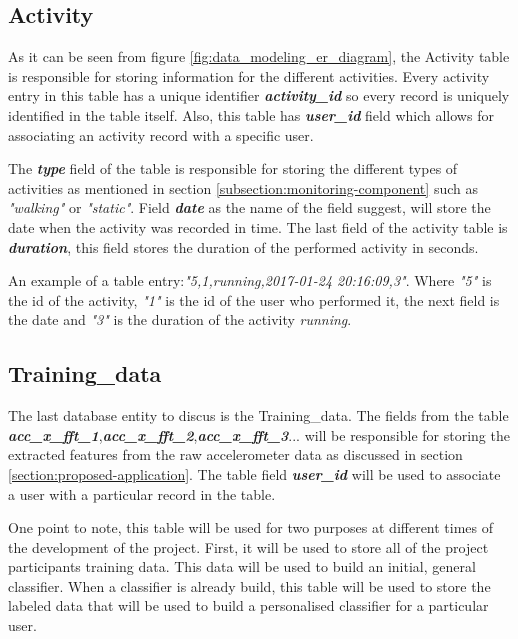         \subsection{Activity}
        As it can be seen from figure \ref{fig:data_modeling_er_diagram}, the Activity table is responsible for storing information for the different activities. Every activity entry in this table has a unique identifier \textbf{\textit{activity\_id}} so every record is uniquely identified in the table itself. Also, this table has \textbf{\textit{user\_id}} field which allows for associating an activity record with a specific user.
        
        The \textbf{\textit{type}} field of the table is responsible for storing the different types of activities as mentioned in section \ref{subsection:monitoring-component} such as \textit{"walking"} or \textit{"static"}. Field \textbf{\textit{date}} as the name of the field suggest, will store the date when the activity was recorded in time. The last field of the activity table is \textbf{\textit{duration}}, this field stores the duration of the performed activity in seconds.
        
        An example of a table entry:\textit{"5,1,running,2017-01-24 20:16:09,3"}. Where \textit{"5"} is the id of the activity, \textit{"1"} is the id of the user who performed it, the next field is the date and \textit{"3"} is the duration of the activity \textit{running}.
        
        \subsection{Training\_data}
        The last database entity to discus is the Training\_data. The fields from the table \textbf{\textit{acc\_x\_fft\_1}},\newline\textbf{\textit{acc\_x\_fft\_2}},\textbf{\textit{acc\_x\_fft\_3}}... will be responsible for storing the extracted features from the raw accelerometer data as discussed in section \ref{section:proposed-application}. The table field \textbf{\textit{user\_id}} will be used to associate a user with a particular record in the table.
        
        One point to note, this table will be used for two purposes at different times of the development of the project. First, it will be used to store all of the project participants training data. This data will be used to build an initial, general classifier. When a classifier is already build, this table will be used to store the labeled data that will be used to build a personalised classifier for a particular user.
    
